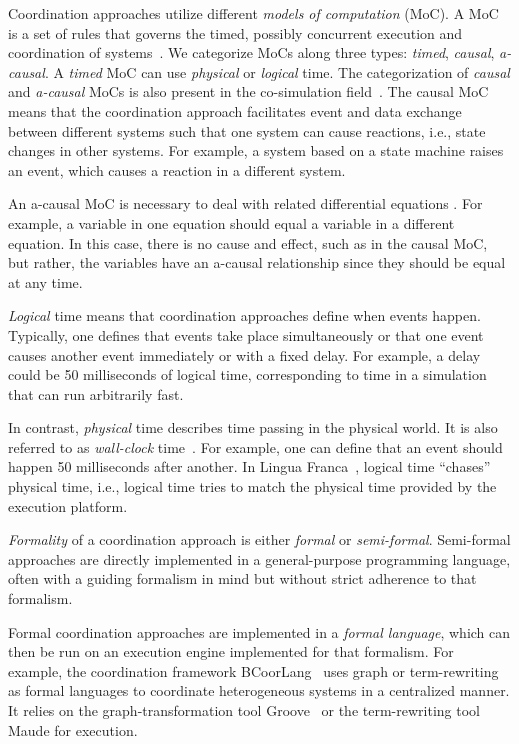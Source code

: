 \documentclass[runningheads]{llncs}
\newcommand{\quotes}[1]{``#1''}
\begin{document}
Coordination approaches utilize different \textit{models of computation} (MoC).
A MoC is a set of rules that governs the timed, possibly concurrent execution and coordination of systems~\cite{ptolemaeusSystemDesignModeling2014}.
We categorize MoCs along three types: \textit{timed}, \textit{causal}, \textit{a-causal}.
A \textit{timed} MoC can use \textit{physical} or \textit{logical} time.
The categorization of \textit{causal} and \textit{a-causal} MoCs is also present in the co-simulation field~\cite{gomesCoSimulationSurvey2019}.
The causal MoC means that the coordination approach facilitates event and data exchange between different systems such that one system can cause reactions, i.e., state changes in other systems.
For example, a system based on a state machine raises an event, which causes a reaction in a different system.

An a-causal MoC is necessary to deal with related differential equations \cite{lecoentGuaranteedCosimulationCyberphysical2020}.
For example, a variable in one equation should equal a variable in a different equation.
In this case, there is no cause and effect, such as in the causal MoC, but rather, the variables have an a-causal relationship since they should be equal at any time.

\textit{Logical} time means that coordination approaches define when events happen.
Typically, one defines that events take place simultaneously or that one event causes another event immediately or with a fixed delay.
For example, a delay could be 50 milliseconds of logical time, corresponding to time in a simulation that can run arbitrarily fast.

In contrast, \textit{physical} time describes time passing in the physical world.
It is also referred to as \textit{wall-clock} time~\cite{gomesCoSimulationSurvey2019}.
For example, one can define that an event should happen 50 milliseconds after another.
In Lingua Franca~\cite{lohstrohReactorsDeterministicModel2020}, logical time \quotes{chases} physical time, i.e., logical time tries to match the physical time provided by the execution platform.

\textit{Formality} of a coordination approach is either \textit{formal} or \textit{semi-formal}.
Semi-formal approaches are directly implemented in a general-purpose programming language, often with a guiding formalism in mind but without strict adherence to that formalism.

Formal coordination approaches are implemented in a \textit{formal language}, which can then be run on an execution engine implemented for that formalism.
For example, the coordination framework BCoorLang~\cite{krauterBehavioralConsistencyMultimodeling2023} uses graph or term-rewriting as formal languages to coordinate heterogeneous systems in a centralized manner.
It relies on the graph-transformation tool Groove~\cite{rensinkGROOVESimulatorTool2004} or the term-rewriting tool Maude for execution.
\end{document}
